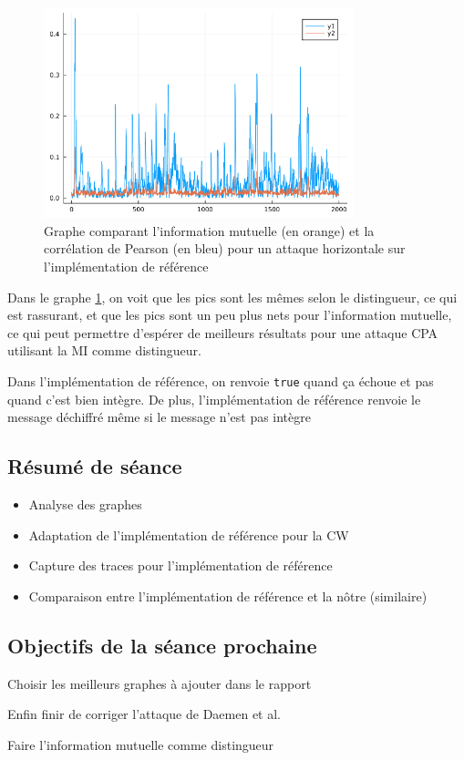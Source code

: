 \documentclass[12pt]{article}
\newcommand{\cmark}{\ding{51}}%
\newcommand{\done}{\rlap{$\square$}{\raisebox{2pt}{\large\hspace{1pt}\cmark}}%
	\hspace{-2.5pt}}
\begin{document}
	\begin{figure}[H]
		\centering
		\includegraphics[width=0.8\textwidth]{corr_vs_MI_hHW}
		\caption{Graphe comparant l'information mutuelle (en orange) et la corrélation de Pearson (en bleu) pour un attaque horizontale sur l'implémentation de référence}
		\label{corvsMI}
	\end{figure}
	
	Dans le graphe \ref{corvsMI}, on voit que les pics sont les mêmes selon le distingueur, ce qui est rassurant, et que les pics sont un peu plus nets pour l'information mutuelle, ce qui peut permettre d'espérer de meilleurs résultats pour une attaque CPA utilisant la MI comme distingueur.
	
	\warning Dans l'implémentation de référence, on renvoie \verb|true| quand ça échoue et pas quand c'est bien intègre. De plus, l'implémentation de référence renvoie le message déchiffré même si le message n'est pas intègre
	
	\subsection{Résumé de séance}
	\begin{itemize}
		\item Analyse des graphes
		\item Adaptation de l'implémentation de référence pour la CW
		\item Capture des traces pour l'implémentation de référence
		\item Comparaison entre l'implémentation de référence et la nôtre (similaire)
	\end{itemize}
	
	\subsection{Objectifs de la séance prochaine}
	\begin{todolist}
		\item[\done] Choisir les meilleurs graphes à ajouter dans le rapport
		\item Enfin finir de corriger l'attaque de Daemen et al.
		\item[\done] Faire l'information mutuelle comme distingueur
	\end{todolist}
	
\end{document}
